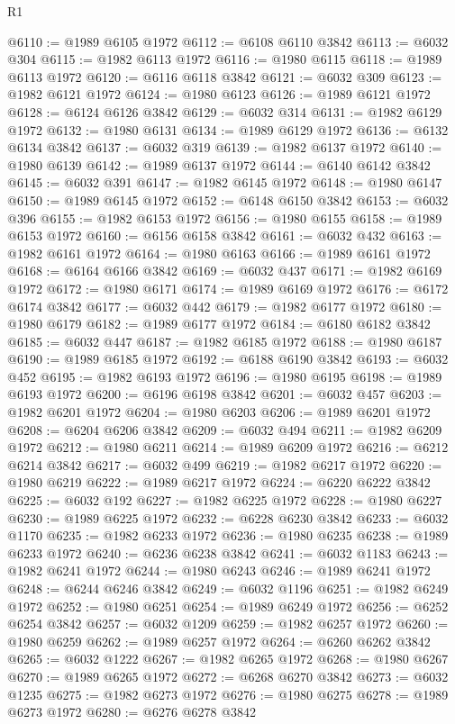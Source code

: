 \begin{lexlean}{R1}
\begin{coremodule}
@6110 := @1989 @6105 @1972
@6112 := @6108 @6110 @3842
@6113 := @6032 @304
@6115 := @1982 @6113 @1972
@6116 := @1980 @6115
@6118 := @1989 @6113 @1972
@6120 := @6116 @6118 @3842
@6121 := @6032 @309
@6123 := @1982 @6121 @1972
@6124 := @1980 @6123
@6126 := @1989 @6121 @1972
@6128 := @6124 @6126 @3842
@6129 := @6032 @314
@6131 := @1982 @6129 @1972
@6132 := @1980 @6131
@6134 := @1989 @6129 @1972
@6136 := @6132 @6134 @3842
@6137 := @6032 @319
@6139 := @1982 @6137 @1972
@6140 := @1980 @6139
@6142 := @1989 @6137 @1972
@6144 := @6140 @6142 @3842
@6145 := @6032 @391
@6147 := @1982 @6145 @1972
@6148 := @1980 @6147
@6150 := @1989 @6145 @1972
@6152 := @6148 @6150 @3842
@6153 := @6032 @396
@6155 := @1982 @6153 @1972
@6156 := @1980 @6155
@6158 := @1989 @6153 @1972
@6160 := @6156 @6158 @3842
@6161 := @6032 @432
@6163 := @1982 @6161 @1972
@6164 := @1980 @6163
@6166 := @1989 @6161 @1972
@6168 := @6164 @6166 @3842
@6169 := @6032 @437
@6171 := @1982 @6169 @1972
@6172 := @1980 @6171
@6174 := @1989 @6169 @1972
@6176 := @6172 @6174 @3842
@6177 := @6032 @442
@6179 := @1982 @6177 @1972
@6180 := @1980 @6179
@6182 := @1989 @6177 @1972
@6184 := @6180 @6182 @3842
@6185 := @6032 @447
@6187 := @1982 @6185 @1972
@6188 := @1980 @6187
@6190 := @1989 @6185 @1972
@6192 := @6188 @6190 @3842
@6193 := @6032 @452
@6195 := @1982 @6193 @1972
@6196 := @1980 @6195
@6198 := @1989 @6193 @1972
@6200 := @6196 @6198 @3842
@6201 := @6032 @457
@6203 := @1982 @6201 @1972
@6204 := @1980 @6203
@6206 := @1989 @6201 @1972
@6208 := @6204 @6206 @3842
@6209 := @6032 @494
@6211 := @1982 @6209 @1972
@6212 := @1980 @6211
@6214 := @1989 @6209 @1972
@6216 := @6212 @6214 @3842
@6217 := @6032 @499
@6219 := @1982 @6217 @1972
@6220 := @1980 @6219
@6222 := @1989 @6217 @1972
@6224 := @6220 @6222 @3842
@6225 := @6032 @192
@6227 := @1982 @6225 @1972
@6228 := @1980 @6227
@6230 := @1989 @6225 @1972
@6232 := @6228 @6230 @3842
@6233 := @6032 @1170
@6235 := @1982 @6233 @1972
@6236 := @1980 @6235
@6238 := @1989 @6233 @1972
@6240 := @6236 @6238 @3842
@6241 := @6032 @1183
@6243 := @1982 @6241 @1972
@6244 := @1980 @6243
@6246 := @1989 @6241 @1972
@6248 := @6244 @6246 @3842
@6249 := @6032 @1196
@6251 := @1982 @6249 @1972
@6252 := @1980 @6251
@6254 := @1989 @6249 @1972
@6256 := @6252 @6254 @3842
@6257 := @6032 @1209
@6259 := @1982 @6257 @1972
@6260 := @1980 @6259
@6262 := @1989 @6257 @1972
@6264 := @6260 @6262 @3842
@6265 := @6032 @1222
@6267 := @1982 @6265 @1972
@6268 := @1980 @6267
@6270 := @1989 @6265 @1972
@6272 := @6268 @6270 @3842
@6273 := @6032 @1235
@6275 := @1982 @6273 @1972
@6276 := @1980 @6275
@6278 := @1989 @6273 @1972
@6280 := @6276 @6278 @3842

\end{coremodule}
\end{lexlean}
